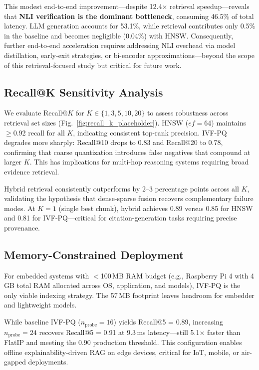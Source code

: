 \documentclass[conference]{IEEEtran}
\begin{document}
This modest end-to-end improvement—despite 12.4$\times$ retrieval speedup—reveals that \textbf{NLI verification is the dominant bottleneck}, consuming 46.5\% of total latency. LLM generation accounts for 53.1\%, while retrieval contributes only 0.5\% in the baseline and becomes negligible (0.04\%) with HNSW. Consequently, further end-to-end acceleration requires addressing NLI overhead via model distillation, early-exit strategies, or bi-encoder approximations—beyond the scope of this retrieval-focused study but critical for future work.

\subsection{Recall@K Sensitivity Analysis}

We evaluate Recall@$K$ for $K \in \{1, 3, 5, 10, 20\}$ to assess robustness across retrieval set sizes (Fig.~\ref{fig:recall_k_placeholder}). HNSW ($ef{=}64$) maintains $\geq$0.92 recall for all $K$, indicating consistent top-rank precision. IVF-PQ degrades more sharply: Recall@10 drops to 0.83 and Recall@20 to 0.78, confirming that coarse quantization introduces false negatives that compound at larger $K$. This has implications for multi-hop reasoning systems requiring broad evidence retrieval.

Hybrid retrieval consistently outperforms by 2--3 percentage points across all $K$, validating the hypothesis that dense-sparse fusion recovers complementary failure modes. At $K{=}1$ (single best chunk), hybrid achieves 0.89 versus 0.85 for HNSW and 0.81 for IVF-PQ—critical for citation-generation tasks requiring precise provenance.

\subsection{Memory-Constrained Deployment}

For embedded systems with $<$100\,MB RAM budget (e.g., Raspberry Pi 4 with 4\,GB total RAM allocated across OS, application, and models), IVF-PQ is the only viable indexing strategy. The 57\,MB footprint leaves headroom for embedder and lightweight models.

While baseline IVF-PQ ($n_{\mathrm{probe}}{=}16$) yields Recall@5 = 0.89, increasing $n_{\mathrm{probe}}{=}24$ recovers Recall@5 = 0.91 at 9.3\,ms latency—still 5.1$\times$ faster than FlatIP and meeting the 0.90 production threshold. This configuration enables offline explainability-driven RAG on edge devices, critical for IoT, mobile, or air-gapped deployments.
\end{document}

